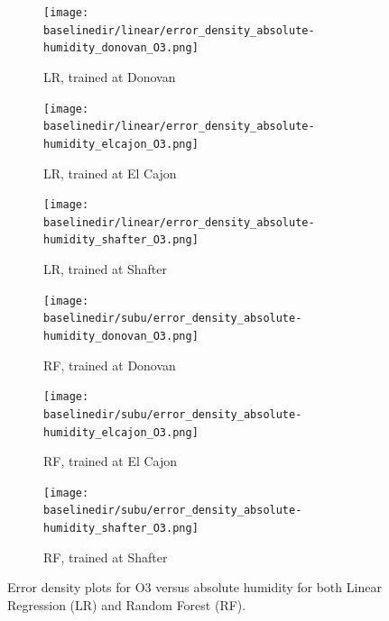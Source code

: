 \documentclass[journal abbreviation, manuscript]{copernicus}
\begin{document}

\begin{figure}[H]
\centering
\begin{subfigure}{0.33\textwidth}
\texttt{[image: \\baselinedir/linear/error\_density\_absolute-humidity\_donovan\_O3.png]}
\caption{LR, trained at Donovan}
\end{subfigure}
\begin{subfigure}{0.33\textwidth}
\texttt{[image: \\baselinedir/linear/error\_density\_absolute-humidity\_elcajon\_O3.png]}
\caption{LR, trained at El Cajon}
\end{subfigure}
\begin{subfigure}{0.33\textwidth}
\texttt{[image: \\baselinedir/linear/error\_density\_absolute-humidity\_shafter\_O3.png]}
\caption{LR, trained at Shafter}
\end{subfigure}
\begin{subfigure}{0.33\textwidth}
\texttt{[image: \\baselinedir/subu/error\_density\_absolute-humidity\_donovan\_O3.png]}
\caption{RF, trained at Donovan}
\end{subfigure}
\begin{subfigure}{0.33\textwidth}
\texttt{[image: \\baselinedir/subu/error\_density\_absolute-humidity\_elcajon\_O3.png]}
\caption{RF, trained at El Cajon}
\end{subfigure}
\begin{subfigure}{0.33\textwidth}
\texttt{[image: \\baselinedir/subu/error\_density\_absolute-humidity\_shafter\_O3.png]}
\caption{RF, trained at Shafter}
\end{subfigure}
\caption{Error density plots for O3 versus absolute humidity for both Linear Regression (LR) and Random Forest (RF).}
\label{fig:error-density}
\end{figure}
\end{document}
